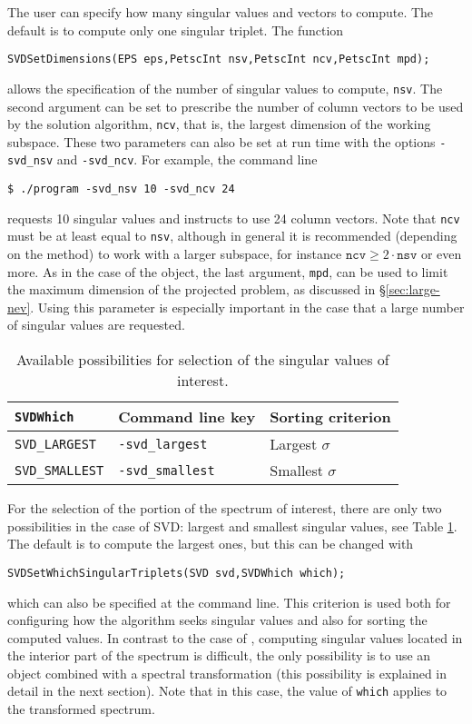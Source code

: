 The user can specify how many singular values and vectors to compute. The default is to compute only one singular triplet. The function
	\begin{Verbatim}[fontsize=\small]
	SVDSetDimensions(EPS eps,PetscInt nsv,PetscInt ncv,PetscInt mpd);
	\end{Verbatim}
allows the specification of the number of singular values to compute, \texttt{nsv}. The second argument can be set to prescribe the number of column vectors to be used by the solution algorithm, \texttt{ncv}, that is, the largest dimension of the working subspace. These two parameters can also be set at run time with the options \Verb!-svd_nsv! and \Verb!-svd_ncv!. For example, the command line
\begin{Verbatim}[fontsize=\small]
	$ ./program -svd_nsv 10 -svd_ncv 24
\end{Verbatim}
requests 10 singular values and instructs to use 24 column vectors. Note that \texttt{ncv} must be at least equal to \texttt{nsv}, although in general it is recommended (depending on the method) to work with a larger subspace, for instance $\mathtt{ncv}\geq2\cdot\mathtt{nsv}$ or even more.
As in the case of the  object, the last argument, \texttt{mpd}, can be used to limit the maximum dimension of the projected problem, as discussed in \S\ref{sec:large-nev}. Using this parameter is especially important in the case that a large number of singular values are requested.

\begin{table}
\centering
{\small \begin{tabular}{lll}
\texttt{SVDWhich}                  & Command line key                   & Sorting criterion \\\hline
\texttt{SVD\_LARGEST}   & \texttt{-svd\_largest}  & Largest $\sigma$ \\
\texttt{SVD\_SMALLEST}  & \texttt{-svd\_smallest} & Smallest $\sigma$ \\\hline
\end{tabular} }
\caption{\label{tab:whichsvd}Available possibilities for selection of the singular values of interest.}
\end{table}

	For the selection of the portion of the spectrum of interest, there are only two possibilities in the case of SVD: largest and smallest singular values, see Table \ref{tab:whichsvd}. The default is to compute the largest ones, but this can be changed with
	\begin{Verbatim}[fontsize=\small]
	SVDSetWhichSingularTriplets(SVD svd,SVDWhich which);
	\end{Verbatim}
which can also be specified at the command line. This criterion is used both for configuring how the algorithm seeks singular values and also for sorting the computed values. In contrast to the case of , computing singular values located in the interior part of the spectrum is difficult, the only possibility is to use an  object combined with a spectral transformation (this possibility is explained in detail in the next section). Note that in this case, the value of \Verb!which! applies to the transformed spectrum.

